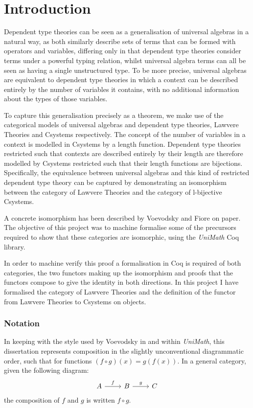 \chapter{Introduction}
Dependent type theories\cite{itt} can be seen as a generalisation of universal
algebras\cite{universalalgebra} in a natural way, as both similarly describe
sets of terms that can be formed with operators and variables, differing only in
that dependent type theories consider terms under a powerful typing relation,
whilst universal algebra terms can all be seen as having a single unstructured
type. To be more precise, universal algebras are equivalent to dependent type
theories in which a context can be described entirely by the number of variables
it contains, with no additional information about the types of those variables.

To capture this generalisation precisely as a theorem, we make use of the
categorical models of universal algebras and dependent type theories, Lawvere
Theories and Csystems respectively. The concept of the number of variables in a
context is modelled in Csystems by a length function. Dependent type theories
restricted such that contexts are described entirely by their length are
therefore modelled by Csystems restricted such that their length functions are
bijections. Specifically, the equivalence between universal algebras and this
kind of restricted dependent type theory can be captured by demonstrating an
isomorphism between the category of Lawvere Theories and the category of
l-bijective Csystems.

A concrete isomorphism has been described by Voevodsky and Fiore on
paper\cite{VoevodskyFiore}. The objective of this project was to machine
formalise some of the precursors required to show that these categories are
isomorphic, using the \textit{UniMath} Coq library\cite{coq}. 

In order to machine verify this proof a formalisation in Coq is required of
both categories, the two functors making up the isomorphism and proofs that the
functors compose to give the identity in both directions. In this project I have
formalised the category of Lawvere Theories and the definition of the functor
from Lawvere Theories to Csystems on objects.

\subsection*{Notation}
In keeping with the style used by Voevodsky
in\cite{VoevodskyFiore}\cite{voevodskycsystems} and within \textit{UniMath},
this dissertation represents composition in the slightly unconventional
diagrammatic order, such that for functions $(f\circ g)(x) = g(f(x))$. In a
general category, given the following diagram:
\[
\begin{tikzcd}
    A\ar[r,"f"]&B\ar[r,"g"]&C
\end{tikzcd}
\]
the composition of $f$ and $g$ is written $f\circ g$.